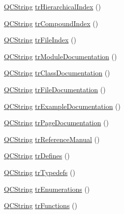 \begin{DoxyCompactItemize}
\item 
\mbox{\hyperlink{class_q_c_string}{Q\+C\+String}} \mbox{\hyperlink{class_translator_portuguese_a46fb7c3e8866eb4734dce3cf93d8644b}{tr\+Hierarchical\+Index}} ()
\item 
\mbox{\hyperlink{class_q_c_string}{Q\+C\+String}} \mbox{\hyperlink{class_translator_portuguese_a7ad269611752df5e18f33bcc115d29ee}{tr\+Compound\+Index}} ()
\item 
\mbox{\hyperlink{class_q_c_string}{Q\+C\+String}} \mbox{\hyperlink{class_translator_portuguese_aff686b1ff820818edce54594005bba0e}{tr\+File\+Index}} ()
\item 
\mbox{\hyperlink{class_q_c_string}{Q\+C\+String}} \mbox{\hyperlink{class_translator_portuguese_a2a27386de1366de0e0e4f38fe73c2c11}{tr\+Module\+Documentation}} ()
\item 
\mbox{\hyperlink{class_q_c_string}{Q\+C\+String}} \mbox{\hyperlink{class_translator_portuguese_ae6f5816122b62bef0dc0090d8970c7b3}{tr\+Class\+Documentation}} ()
\item 
\mbox{\hyperlink{class_q_c_string}{Q\+C\+String}} \mbox{\hyperlink{class_translator_portuguese_a94df9bb8dedf2406561433e61c1dab48}{tr\+File\+Documentation}} ()
\item 
\mbox{\hyperlink{class_q_c_string}{Q\+C\+String}} \mbox{\hyperlink{class_translator_portuguese_afd4d5a5fa30767abf396574af3b22edf}{tr\+Example\+Documentation}} ()
\item 
\mbox{\hyperlink{class_q_c_string}{Q\+C\+String}} \mbox{\hyperlink{class_translator_portuguese_a74d1d84882e71ad90a84cacdd585f2f1}{tr\+Page\+Documentation}} ()
\item 
\mbox{\hyperlink{class_q_c_string}{Q\+C\+String}} \mbox{\hyperlink{class_translator_portuguese_a9fe10e7b93905d937ce2cf6936712b80}{tr\+Reference\+Manual}} ()
\item 
\mbox{\hyperlink{class_q_c_string}{Q\+C\+String}} \mbox{\hyperlink{class_translator_portuguese_af2519296f0977966fc38817b889cdc3c}{tr\+Defines}} ()
\item 
\mbox{\hyperlink{class_q_c_string}{Q\+C\+String}} \mbox{\hyperlink{class_translator_portuguese_ac580870c36dc2e0d8fc026dd718b08ff}{tr\+Typedefs}} ()
\item 
\mbox{\hyperlink{class_q_c_string}{Q\+C\+String}} \mbox{\hyperlink{class_translator_portuguese_a7a37ccb3c92adb7c0f9e6853462198f6}{tr\+Enumerations}} ()
\item 
\mbox{\hyperlink{class_q_c_string}{Q\+C\+String}} \mbox{\hyperlink{class_translator_portuguese_a8699679f6ed09ba4517c609689a4f6df}{tr\+Functions}} ()

\end{DoxyCompactItemize}
